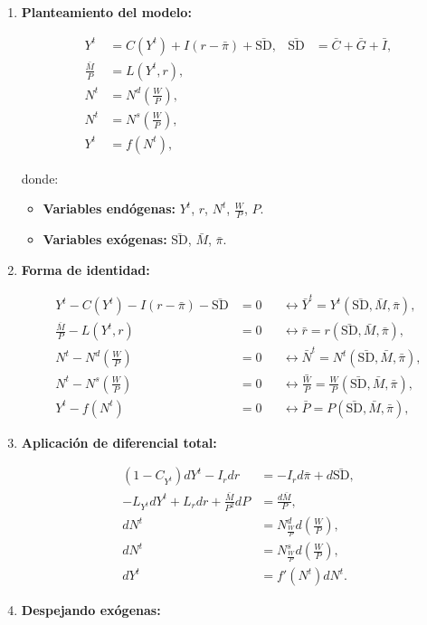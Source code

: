 \documentclass[
  doc,
  floatsintext,
  longtable,
  a4paper,
  nolmodern,
  notxfonts,
  notimes,
  colorlinks=true,linkcolor=blue,citecolor=blue,urlcolor=blue]{apa7}
\providecommand{\tightlist}{%
  \setlength{\itemsep}{0pt}\setlength{\parskip}{0pt}}
\begin{document}
\begin{enumerate}
\def\labelenumi{\arabic{enumi}.}
\item
  \textbf{Planteamiento del modelo:}

  \[
  \begin{aligned}
  Y^t &= C(Y^t) + I(r - \bar{\pi}) + \bar{\mathrm{SD}}, & \bar{\mathrm{SD}} &= \bar{C} + \bar{G} + \bar{I}, \\
  \frac{\bar{M}}{P} &= L(Y^t, r), \\
  N^t &= N^d \left( \frac{W}{P} \right), \\
  N^t &= N^s \left( \frac{W}{P} \right), \\
  Y^t &= f(N^t),
  \end{aligned}
  \]

  donde:

  \begin{itemize}
  \tightlist
  \item
    \textbf{Variables endógenas:} \(Y^t\), \(r\), \(N^t\),
    \(\frac{W}{P}\), \(P\).
  \item
    \textbf{Variables exógenas:} \(\bar{\mathrm{SD}}\), \(\bar{M}\),
    \(\bar{\pi}\).
  \end{itemize}
\item
  \textbf{Forma de identidad:}

  \[
  \begin{aligned}
  Y^t - C(Y^t) - I(r - \bar{\pi}) - \bar{\mathrm{SD}} &= 0 & &\leftrightarrow \bar{Y}^t = Y^t(\bar{\mathrm{SD}}, \bar{M}, \bar{\pi}), \\
  \frac{\bar{M}}{P} - L(Y^t, r) &= 0 & &\leftrightarrow \bar{r} = r(\bar{\mathrm{SD}}, \bar{M}, \bar{\pi}), \\
  N^t - N^d \left( \frac{W}{P} \right) &= 0 & &\leftrightarrow \bar{N}^t = N^t(\bar{\mathrm{SD}}, \bar{M}, \bar{\pi}), \\
  N^t - N^s \left( \frac{W}{P} \right) &= 0 & &\leftrightarrow \bar{\frac{W}{P}} = \frac{W}{P}(\bar{\mathrm{SD}}, \bar{M}, \bar{\pi}), \\
  Y^t - f(N^t) &= 0 & &\leftrightarrow \bar{P} = P(\bar{\mathrm{SD}}, \bar{M}, \bar{\pi}),
  \end{aligned}
  \]
\item
  \textbf{Aplicación de diferencial total:}

  \[
  \begin{aligned}
  (1 - C_{Y^t}) dY^t - I_r dr &= -I_r d\bar{\pi} + d\bar{\mathrm{SD}}, \\
  -L_{Y^t} dY^t + L_r dr + \frac{\bar{M}}{P^2} dP &= \frac{d\bar{M}}{P}, \\
  dN^t &= N^d_{\frac{W}{P}} d \left( \frac{W}{P} \right), \\
  dN^t &= N^s_{\frac{W}{P}} d \left( \frac{W}{P} \right), \\
  dY^t &= f'(N^t) dN^t.
  \end{aligned}
  \]
\item
  \textbf{Despejando exógenas:}


\end{enumerate}
\end{document}
